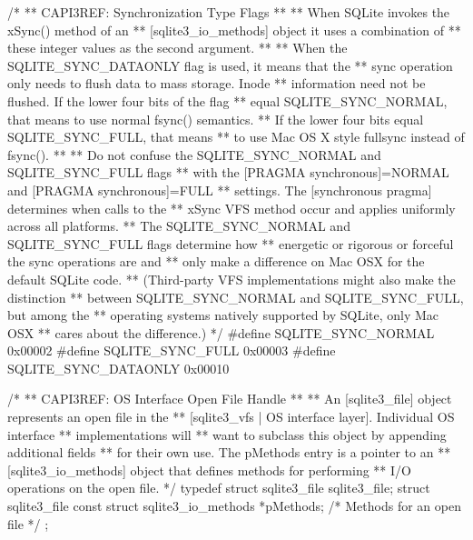 \begin{Codex}[label=sqlite3.h,numbers=left]
{/*
** CAPI3REF: Synchronization Type Flags
**
** When SQLite invokes the xSync() method of an
** [sqlite3_io_methods] object it uses a combination of
** these integer values as the second argument.
**
** When the SQLITE_SYNC_DATAONLY flag is used, it means that the
** sync operation only needs to flush data to mass storage.  Inode
** information need not be flushed. If the lower four bits of the flag
** equal SQLITE_SYNC_NORMAL, that means to use normal fsync() semantics.
** If the lower four bits equal SQLITE_SYNC_FULL, that means
** to use Mac OS X style fullsync instead of fsync().
**
** Do not confuse the SQLITE_SYNC_NORMAL and SQLITE_SYNC_FULL flags
** with the [PRAGMA synchronous]=NORMAL and [PRAGMA synchronous]=FULL
** settings.  The [synchronous pragma] determines when calls to the
** xSync VFS method occur and applies uniformly across all platforms.
** The SQLITE_SYNC_NORMAL and SQLITE_SYNC_FULL flags determine how
** energetic or rigorous or forceful the sync operations are and
** only make a difference on Mac OSX for the default SQLite code.
** (Third-party VFS implementations might also make the distinction
** between SQLITE_SYNC_NORMAL and SQLITE_SYNC_FULL, but among the
** operating systems natively supported by SQLite, only Mac OSX
** cares about the difference.)
*/
#define SQLITE_SYNC_NORMAL        0x00002
#define SQLITE_SYNC_FULL          0x00003
#define SQLITE_SYNC_DATAONLY      0x00010

/*
** CAPI3REF: OS Interface Open File Handle
**
** An [sqlite3_file] object represents an open file in the 
** [sqlite3_vfs | OS interface layer].  Individual OS interface
** implementations will
** want to subclass this object by appending additional fields
** for their own use.  The pMethods entry is a pointer to an
** [sqlite3_io_methods] object that defines methods for performing
** I/O operations on the open file.
*/
typedef struct sqlite3_file sqlite3_file;
struct sqlite3_file {
  const struct sqlite3_io_methods *pMethods;  /* Methods for an open file */
};

}
\end{Codex}
